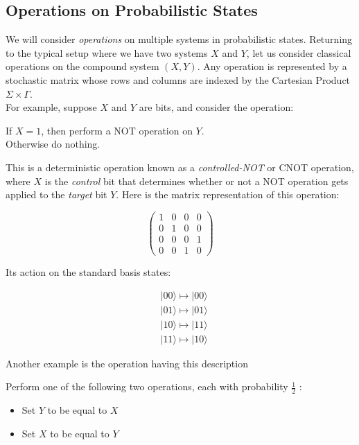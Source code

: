 \documentclass[svgnames]{article}     %
\begin{document}
\subsection{Operations on Probabilistic States}

We will consider \textit{operations} on multiple systems in probabilistic
states. Returning to the typical setup where we have two systems $X$ and $Y$,
let us consider classical operations on the compound system $(X,Y)$. Any
operation is represented by a stochastic matrix whose rows and columns are
indexed by the Cartesian Product $\Sigma \times \Gamma$. \\

For example, suppose $X$ and $Y$ are bits, and consider the operation: \\

\begin{mainbox}{}
  If $X = 1$, then perform a NOT operation on $Y$. \\ Otherwise do nothing.
\end{mainbox}

This is a deterministic operation known as a \textit{controlled-NOT} or CNOT
operation, where $X$ is the \textit{control} bit that determines whether or not
a NOT operation gets applied to the \textit{target} bit $Y$. Here is the matrix
representation of this operation: 

\[
\begin{pmatrix}
  1 & 0 & 0 & 0 \\
  0 & 1 & 0 & 0 \\
  0 & 0 & 0 & 1 \\
  0 & 0 & 1 & 0 
\end{pmatrix}
\] \vspace{5px}

Its action on the standard basis states: 

\begin{align*}
  &|00\rangle \mapsto |00\rangle \\
  &|01\rangle \mapsto |01\rangle \\
  &|10\rangle \mapsto |11\rangle \\
  &|11\rangle \mapsto |10\rangle 
\end{align*}

Another example is the operation having this description

\begin{subbox}{}
  Perform one of the  following two operations, each with probability
  $\frac{1}{2}$ : 
  \begin{itemize}
    \item[-] Set $Y$ to be equal to $X$ 
    \item[-] Set $X$ to be equal to $Y$
  \end{itemize}
\end{subbox}
\end{document}
